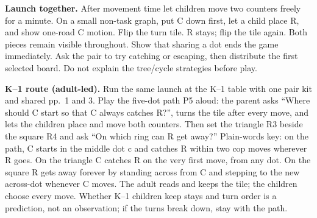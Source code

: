 \textbf{Launch together.} After movement time let children move two counters freely for a minute. On a small non-task graph, put C down first, let a child place R, and show one-road C motion. Flip the turn tile. R stays; flip the tile again. Both pieces remain visible throughout. Show that sharing a dot ends the game immediately. Ask the pair to try catching or escaping, then distribute the first selected board. Do not explain the tree/cycle strategies before play.

\textbf{K--1 route (adult-led).}
Run the same launch at the K--1 table with one pair kit and shared pp.~1 and 3. Play the five-dot path P5 aloud: the parent asks ``Where should C start so that C always catches R?'', turns the tile after every move, and lets the children place and move both counters. Then set the triangle R3 beside the square R4 and ask ``On which ring can R get away?'' Plain-words key: on the path, C starts in the middle dot c and catches R within two cop moves wherever R goes. On the triangle C catches R on the very first move, from any dot. On the square R gets away forever by standing across from C and stepping to the new across-dot whenever C moves. The adult reads and keeps the tile; the children choose every move. Whether K--1 children keep stays and turn order is a prediction, not an observation; if the turns break down, stay with the path.
